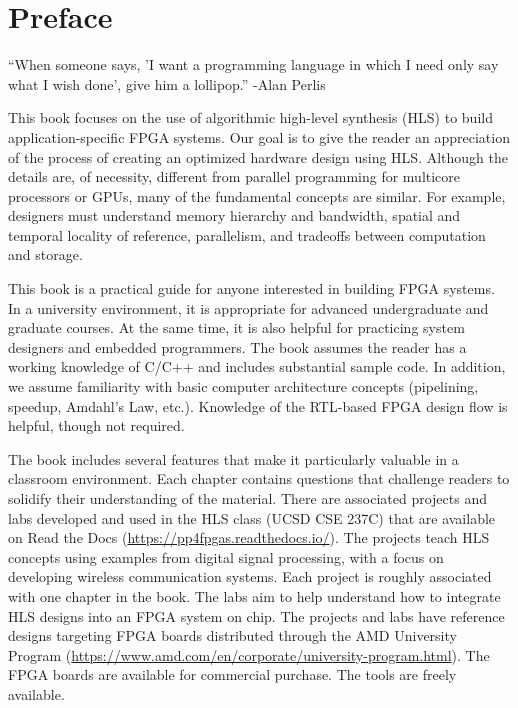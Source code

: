 
\chapter*{Preface}
\begin{aside}
``When someone says, 'I want a programming language in which I need only say what I wish done', give him a lollipop.'' -Alan Perlis
\end{aside}

This book focuses on the use of algorithmic high-level synthesis (HLS) to build application-specific FPGA systems.  Our goal is to give the reader an appreciation of the process of creating an optimized hardware design using HLS. Although the details are, of necessity, different from parallel programming for multicore processors or GPUs, many of the fundamental concepts are similar.  For example, designers must understand memory hierarchy and bandwidth, spatial and temporal locality of reference, parallelism, and tradeoffs between computation and storage.

This book is a practical guide for anyone interested in building FPGA systems.  In a university environment, it is appropriate for advanced undergraduate and graduate courses.  At the same time, it is also helpful for practicing system designers and embedded programmers.  The book assumes the reader has a working knowledge of C/C++ and includes substantial sample code. In addition, we assume familiarity with basic computer architecture concepts (pipelining, speedup, Amdahl's Law, etc.).  Knowledge of the RTL-based FPGA design flow is helpful, though not required.

The book includes several features that make it particularly valuable in a classroom environment.  Each chapter contains questions that challenge readers to solidify their understanding of the material.  There are associated projects and labs developed and used in the HLS class (UCSD CSE 237C) that are available on Read the Docs (\url{https://pp4fpgas.readthedocs.io/}). The projects teach HLS concepts using examples from digital signal processing, with a focus on developing wireless communication systems.  Each project is roughly associated with one chapter in the book. The labs aim to help understand how to integrate HLS designs into an FPGA system on chip. The projects and labs have reference designs targeting FPGA boards distributed through the AMD University Program (\url{https://www.amd.com/en/corporate/university-program.html}).   The FPGA boards are available for commercial purchase.  The \VHLS tools are freely available.

